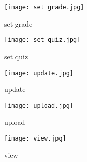 \documentclass{article}
\begin{document}
		\begin{figure}[!h]
			\centering
			\texttt{[image: set grade.jpg]}
			\caption{ set grade}
		\end{figure}
		\begin{figure}[!h]
			\centering
			\texttt{[image: set quiz.jpg]}
			\caption{ set quiz}
		\end{figure}
		\begin{figure}[!h]
			\centering
			\texttt{[image: update.jpg]}
			\caption{update}
		\end{figure}
		\begin{figure}[!h]
			\centering
			\texttt{[image: upload.jpg]}
			\caption{upload}
		\end{figure}
		\begin{figure}[!h]
			\centering
			\texttt{[image: view.jpg]}
			\caption{view}
		\end{figure}
		
		
	
		
   					
\end{document}
